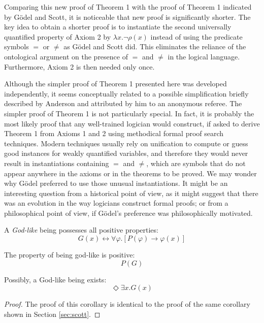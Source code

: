 \documentclass[smallextended]{svjour3}
\newcommand{\imp}{\rightarrow}
\newcommand{\biimp}{\leftrightarrow}
\newcommand{\ex}{\exists}
\newcommand{\pos}{\Diamond} %
\begin{document}
Comparing this new proof of Theorem 1 with the proof of Theorem 1 indicated by G\"odel and Scott, it is noticeable that new proof is significantly shorter. The key idea to obtain a shorter proof is to instantiate the second universally quantified property of Axiom 2 by $\lambda x. \neg \rho(x)$ instead of using the predicate symbols $=$ or $\neq$ as G\"odel and Scott did. This eliminates the reliance of the ontological argument on the presence of $=$ and $\neq$ in the logical language. Furthermore, Axiom 2 is then needed only once.

Although the simpler proof of Theorem 1 presented here was developed independently, it seems conceptually related to a possible simplification briefly described by Anderson \citep[footnote 2]{and90} and attributed by him to an anonymous referee. The simpler proof of Theorem 1 is not particularly special. In fact, it is probably the most likely proof that any well-trained logician would construct, if asked to derive Theorem 1 from Axioms 1 and 2 using methodical formal proof search techniques. Modern techniques usually rely on unification to compute or guess good instances for weakly quantified variables, and therefore they would never result in instantiations containing $=$ and $\neq$, which are symbols that do not appear anywhere in the axioms or in the theorems to be proved. We may wonder why G\"odel preferred to use those unusual instantiations. It might be an interesting question from a historical point of view, as it might suggest that there was an evolution in the way logicians construct formal proofs; or from a philosophical point of view, if G\"odel's preference was philosophically motivated.



\begin{definition}
\label{N:D1}
A \emph{God-like} being possesses all positive properties:
$$
G(x) \biimp \forall \varphi. [P(\varphi) \to \varphi(x)]
$$
\end{definition}

\begin{axiom}
\label{N:A3}
The property of being god-like is positive:
$$
P(G)
$$
\end{axiom}

\begin{corollary}
\label{N:C1}
Possibly, a God-like being exists:
$$
\pos \ex x. G(x)
$$
\end{corollary}
\begin{proof} The proof of this corollary is identical to the proof of the same corollary shown in Section \ref{sec:scott}.
\end{proof}
\end{document}
